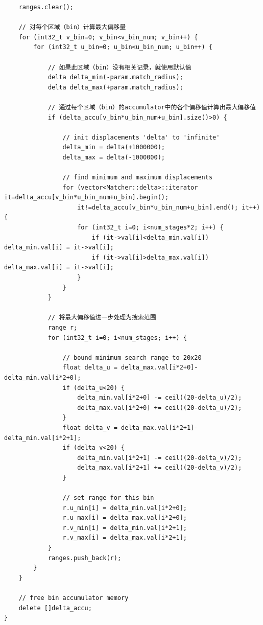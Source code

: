 \documentclass[UTF8]{ctexart}
\begin{document}
\begin{verbatim}
    ranges.clear();
    
    // 对每个区域（bin）计算最大偏移量
    for (int32_t v_bin=0; v_bin<v_bin_num; v_bin++) {
        for (int32_t u_bin=0; u_bin<u_bin_num; u_bin++) {
            
            // 如果此区域（bin）没有相关记录，就使用默认值
            delta delta_min(-param.match_radius);
            delta delta_max(+param.match_radius);
            
            // 通过每个区域（bin）的accumulator中的各个偏移值计算出最大偏移值
            if (delta_accu[v_bin*u_bin_num+u_bin].size()>0) {
                
                // init displacements 'delta' to 'infinite'
                delta_min = delta(+1000000);
                delta_max = delta(-1000000);
                
                // find minimum and maximum displacements
                for (vector<Matcher::delta>::iterator it=delta_accu[v_bin*u_bin_num+u_bin].begin();
                    it!=delta_accu[v_bin*u_bin_num+u_bin].end(); it++) {
                    for (int32_t i=0; i<num_stages*2; i++) {
                        if (it->val[i]<delta_min.val[i]) delta_min.val[i] = it->val[i];
                        if (it->val[i]>delta_max.val[i]) delta_max.val[i] = it->val[i];
                    }
                }
            }
        
            // 将最大偏移值进一步处理为搜索范围
            range r;
            for (int32_t i=0; i<num_stages; i++) {
                
                // bound minimum search range to 20x20
                float delta_u = delta_max.val[i*2+0]-delta_min.val[i*2+0];
                if (delta_u<20) {
                    delta_min.val[i*2+0] -= ceil((20-delta_u)/2);
                    delta_max.val[i*2+0] += ceil((20-delta_u)/2);
                }
                float delta_v = delta_max.val[i*2+1]-delta_min.val[i*2+1];
                if (delta_v<20) {
                    delta_min.val[i*2+1] -= ceil((20-delta_v)/2);
                    delta_max.val[i*2+1] += ceil((20-delta_v)/2);
                }
                
                // set range for this bin
                r.u_min[i] = delta_min.val[i*2+0];
                r.u_max[i] = delta_max.val[i*2+0];
                r.v_min[i] = delta_min.val[i*2+1];
                r.v_max[i] = delta_max.val[i*2+1];
            }
            ranges.push_back(r);      
        }
    }
    
    // free bin accumulator memory
    delete []delta_accu;
}
    \end{verbatim}
\end{document}
